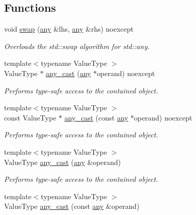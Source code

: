\subsection*{Functions}
\begin{DoxyCompactItemize}
\item 
void \mbox{\hyperlink{namespacebfl_1_1any_adb1328ea975e3bf9c0addc1689215bad}{swap}} (\mbox{\hyperlink{classbfl_1_1any_1_1any}{any}} \&lhs, \mbox{\hyperlink{classbfl_1_1any_1_1any}{any}} \&rhs) noexcept
\begin{DoxyCompactList}\small\item\em Overloads the std\+::swap algorithm for std\+::any. \end{DoxyCompactList}\item 
{\footnotesize template$<$typename Value\+Type $>$ }\\Value\+Type $\ast$ \mbox{\hyperlink{namespacebfl_1_1any_a4ecb51ad57b3fa935cabdc0dcdcb4df1}{any\+\_\+cast}} (\mbox{\hyperlink{classbfl_1_1any_1_1any}{any}} $\ast$operand) noexcept
\begin{DoxyCompactList}\small\item\em Performs type-\/safe access to the contained object. \end{DoxyCompactList}\item 
{\footnotesize template$<$typename Value\+Type $>$ }\\const Value\+Type $\ast$ \mbox{\hyperlink{namespacebfl_1_1any_a16c163e06edb8565e3b47c4bf6136a52}{any\+\_\+cast}} (const \mbox{\hyperlink{classbfl_1_1any_1_1any}{any}} $\ast$operand) noexcept
\begin{DoxyCompactList}\small\item\em Performs type-\/safe access to the contained object. \end{DoxyCompactList}\item 
{\footnotesize template$<$typename Value\+Type $>$ }\\Value\+Type \mbox{\hyperlink{namespacebfl_1_1any_a2b5d2dbb287832915598b087083885be}{any\+\_\+cast}} (\mbox{\hyperlink{classbfl_1_1any_1_1any}{any}} \&operand)
\begin{DoxyCompactList}\small\item\em Performs type-\/safe access to the contained object. \end{DoxyCompactList}\item 
{\footnotesize template$<$typename Value\+Type $>$ }\\Value\+Type \mbox{\hyperlink{namespacebfl_1_1any_aa10ebe32454df7c7769d7391c72f2230}{any\+\_\+cast}} (const \mbox{\hyperlink{classbfl_1_1any_1_1any}{any}} \&operand)

\end{DoxyCompactItemize}
